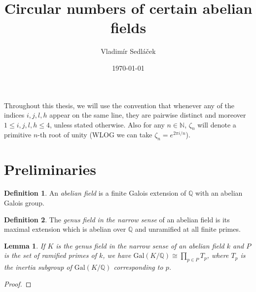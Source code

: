 \documentclass[12pt,a4paper]{article}
\newtheorem{lemma}[theorem]{Lemma}
\theoremstyle{definition}
\newtheorem{definition}{Definition}[section]
\newcommand{\Nbb}{\mathbb{N}}
\newcommand{\Q}{\mathbb{Q}}
\newcommand{\Gal}{\mathrm{Gal}}
\begin{document}
\addtolength{\topmargin}{-30 pt}                   %
\setlength{\headsep}{10 pt}                      %
\renewcommand{\headrulewidth}{1 pt}                %

\title{Circular numbers of certain abelian fields}
\author{Vladimír Sedláček}
\date{\today}
\maketitle

Throughout this thesis, we will use the convention that whenever any of the indices $i,j,l,h$ appear on the same line, they are pairwise distinct and moreover $1\leq i,j,l,h\leq 4$, unless stated otherwise. Also for any $n\in \Nbb$, $\zeta_n$ will denote a primitive $n$-th root of unity (WLOG we can take $\zeta_n=e^{2\pi i/n}$). 

\section{Preliminaries}
\begin{definition}
An \textit{abelian field} is a finite Galois extension of $\Q$ with an abelian Galois group. 
\end{definition}

\begin{definition}
The \textit{genus field in the narrow sense} of an abelian field is its maximal extension which is abelian over $\Q$ and unramified at all finite primes. %
\end{definition}

\begin{lemma}\label{genus}
If $K$ is the genus field in the narrow sense of an abelian field $k$ and $P$ is the set of ramified primes of $k$, we have $\Gal(K/\Q)\cong \prod_{p\in P} T_p$, where $T_p$ is the inertia subgroup of $\Gal(K/\Q)$ corresponding to $p$.
\end{lemma}
\begin{proof}
\end{proof}
\end{document}

